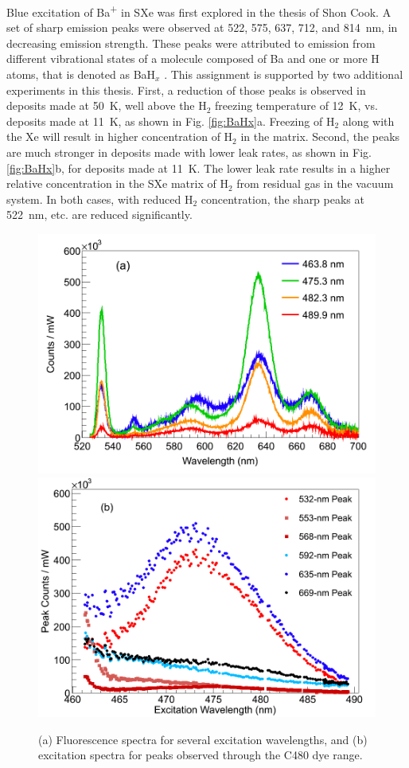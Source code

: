 
Blue excitation of Ba\textsuperscript{+} in SXe was first explored in the thesis of Shon Cook.  A set of sharp emission peaks were observed at 522, 575, 637, 712, and 814~nm, in decreasing emission strength.  These peaks were attributed to emission from different vibrational states of a molecule composed of Ba and one or more H atoms, that is denoted as BaH$_{x}$ \cite{Shon}.  This assignment is supported by two additional experiments in this thesis.  First, a reduction of those peaks is observed in deposits made at 50~K, well above the H$_{2}$ freezing temperature of 12~K, vs. deposits made at 11~K, as shown in Fig. \ref{fig:BaHx}a.  Freezing of H$_2$ along with the Xe will result in higher concentration of H$_2$ in the matrix.  Second, the peaks are much stronger in deposits made with lower leak rates, as shown in Fig. \ref{fig:BaHx}b, for deposits made at 11~K.  The lower leak rate results in a higher relative concentration in the SXe matrix of H$_2$ from residual gas in the vacuum system.  In both cases, with reduced H$_2$ concentration, the sharp peaks at 522~nm, etc. are reduced significantly.

\begin{figure} %
        \centering
                \includegraphics[width=.7\textwidth]{figures/excitspec_blu_a.png}
                \includegraphics[width=.7\textwidth]{figures/excitspecBlue_b.png}
                \caption{(a) Fluorescence spectra for several excitation wavelengths, and (b) excitation spectra for peaks observed through the C480 dye range. \cite{Mong2015}}
\label{fig:excitspecBlue}
\end{figure}

